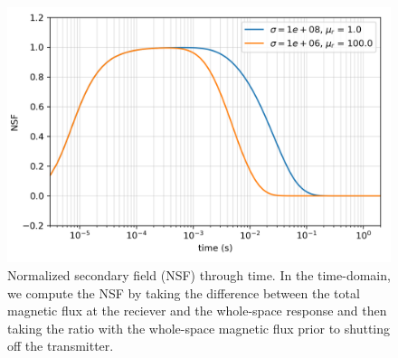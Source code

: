 \begin{figure}[htb]
    \begin{center}
    \includegraphics[width=0.6\columnwidth]{figures/tdemNSF.png}
    \end{center}
\caption{
    Normalized secondary field (NSF) through time.
    In the time-domain, we compute the NSF by taking the difference between the total magnetic flux at the reciever and the whole-space response
    and then taking the ratio with the whole-space magnetic flux prior to shutting off the transmitter.
}
\label{fig:tdemNSF}
\end{figure}
